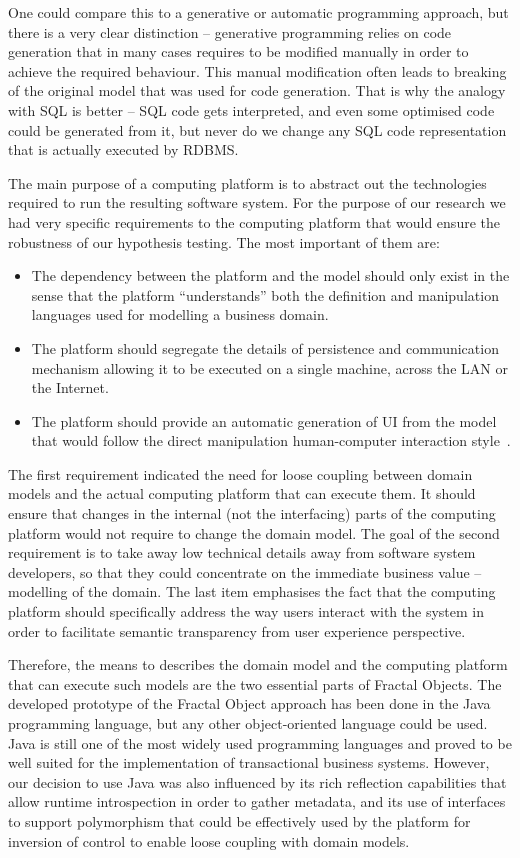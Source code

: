 \documentclass[a4paper,10pt,oneside,openright,final]{memoir} %
\begin{document}
  One could compare this to a generative or automatic programming approach, but there is a very clear distinction -- generative programming relies on code generation that in many cases requires to be modified manually in order to achieve the required behaviour.
  This manual modification often leads to breaking of the original model that was used for code generation.
  That is why the analogy with SQL is better -- SQL code gets interpreted, and even some optimised code could be generated from it, but never do we change any SQL code representation that is actually executed by RDBMS.
    
  The main purpose of a computing platform is to abstract out the technologies required to run the resulting software system.
  For the purpose of our research we had very specific requirements to the computing platform that would ensure the robustness of our hypothesis testing.
  The most important of them are:
  \begin{itemize}
    \item The dependency between the platform and the model should only exist in the sense that the platform ``understands'' both the definition and manipulation languages used for modelling a business domain.
    \item The platform should segregate the details of persistence and communication mechanism allowing it to be executed on a single machine, across the LAN or the Internet.
    \item The platform should provide an automatic generation of UI from the model that would follow the direct manipulation human-computer interaction style~\cite{shneiderman1982, shneiderman1983}.
  \end{itemize}

  The first requirement indicated the need for loose coupling between domain models and the actual computing platform that can execute them.
  It should ensure that changes in the internal (not the interfacing) parts of the computing platform would not require to change the domain model.
  The goal of the second requirement is to take away low technical details away from software system developers, so that they could concentrate on the immediate business value -- modelling of the domain.
  The last item emphasises the fact that the computing platform should specifically address the way users interact with the system in order to facilitate semantic transparency from user experience perspective.

  Therefore, the means to describes the domain model and the computing platform that can execute such models are the two essential parts of Fractal Objects.
  The developed prototype of the Fractal Object approach has been done in the Java programming language, but any other object-oriented language could be used.
  Java is still one of the most widely used programming languages and proved to be well suited for the implementation of transactional business systems.
  However, our decision to use Java was also influenced by its rich reflection capabilities that allow runtime introspection in order to gather metadata, and its use of interfaces to support polymorphism that could be effectively used by the platform for inversion of control to enable loose coupling with domain models.
\end{document}
